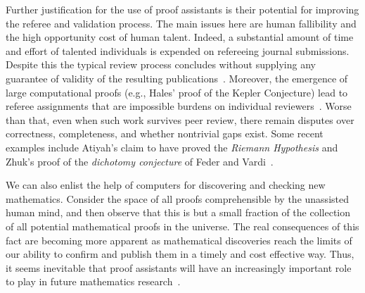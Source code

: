 \documentclass[11pt]{amsart}  %
\begin{document}

Further justification for the use of proof assistants is their potential for improving the referee and validation process.  The main issues here are human fallibility and the high opportunity cost of human talent. Indeed, a substantial amount of time and effort of talented individuals is expended on refereeing journal submissions. Despite this the typical review process concludes without supplying any guarantee of validity of the resulting publications~\cite{fasel:2017}.
Moreover, the emergence of large computational proofs (e.g., Hales' proof of the Kepler Conjecture) lead to referee assignments that are impossible burdens on individual reviewers~\cite{heule:2017}. Worse than that, even when such work survives peer review, there remain disputes over correctness, completeness, and whether nontrivial gaps exist. Some recent examples include Atiyah's claim to have proved the \emph{Riemann Hypothesis} and Zhuk's proof of the \emph{\csp dichotomy conjecture} of Feder and Vardi~\cite{zhuk:2017}.


We can also enlist the help of computers for discovering and checking new mathematics. Consider the space of all proofs comprehensible by the unassisted human mind, and then observe that this is but a small fraction of the collection of all potential mathematical proofs in the universe. The real consequences of this fact are becoming more apparent as mathematical discoveries reach the limits of our ability to confirm and publish them in a timely and cost effective way. Thus, it seems inevitable that proof assistants will have an increasingly important role to play in future mathematics research~\cite{harris:2015}.
\end{document}
